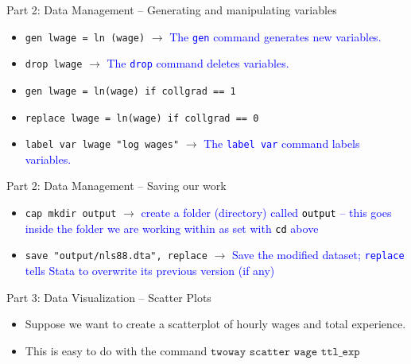 \documentclass[11pt,notes=hide,aspectratio=169,mathserif]{beamer}
\begin{document}
\begin{frame}{Part 2: Data Management -- Generating and manipulating variables }
\begin{itemize}
     \item \texttt{gen lwage = ln (wage)}  $\rightarrow$ \textcolor{blue}{The \texttt{gen} command generates new variables.} \smallskip
     \item \texttt{drop lwage}  $\rightarrow$ \textcolor{blue}{The \texttt{drop} command deletes variables.} \smallskip
     \item \texttt{gen lwage = ln(wage) if collgrad == 1}  
     \item \texttt{replace lwage = ln(wage) if collgrad == 0} 
     \item \texttt{label var lwage "log wages"}  $\rightarrow$ \textcolor{blue}{The \texttt{label var} command labels variables.} \smallskip
\end{itemize}
\end{frame}

\begin{frame}{Part 2: Data Management -- Saving our work}
    \begin{itemize}
        \item \texttt{cap mkdir output}	$\rightarrow$ \textcolor{blue}{create a folder (directory) called \textcolor{black}{\texttt{output}} -- this goes inside the folder we are working within as set with \textcolor{black}{\texttt{cd}} above }\smallskip
        \item \texttt{save "output/nls88.dta", replace} $\rightarrow$ \textcolor{blue}{Save the modified dataset; \texttt{replace} tells Stata to overwrite its previous version (if any)}\smallskip
    \end{itemize}
\end{frame}

\begin{frame}{Part 3: Data Visualization -- Scatter Plots}
    \begin{itemize}
        \item Suppose we want to create a scatterplot of hourly wages and total experience. 
        \item This is easy to do with the command 
            $\texttt{twoway scatter wage ttl\_exp}$
    \end{itemize}
\end{frame}
\end{document}
